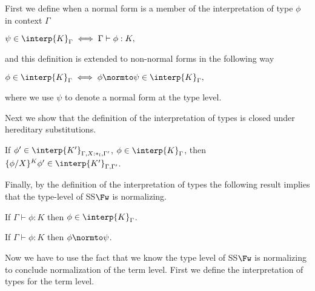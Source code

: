 \begin{definition}
  \label{def:interpretation_of_types_ssfw}
  First we define when a normal form is a member of the interpretation of type $\phi$ in context $\Gamma$
  \begin{center}
    \begin{math}
      \psi \in \interp{K}_\Gamma \iff \Gamma \vdash \phi:K,
  \end{math}
  \end{center}
  and this definition is extended to non-normal forms in the following way
  \begin{center}
    \begin{math}
      \phi \in \interp{K}_\Gamma \iff \phi \normto \psi \in \interp{K}_\Gamma,
  \end{math}
  \end{center}
 where we use $\psi$ to denote a normal form at the type level.
\end{definition}

\noindent 
Next we show that the definition of the interpretation of types is closed under
hereditary substitutions.  

\begin{lemma}
  If $\phi' \in \interp{K'}_{\Gamma,X:*_l,\Gamma'}$, $\phi \in \interp{K}_\Gamma$, then 
  $\{\phi/X\}^K \phi' \in \interp{K'}_{\Gamma,\Gamma'}$.
  
  \label{lemma:interpretation_of_types_closed_substitution_ssfw}
\end{lemma}

\noindent
Finally, by the definition of the interpretation of types the following result implies that the type-level
of SS$\Fw$ is normalizing.
\begin{thm}
  If $\Gamma \vdash \phi:K$ then $\phi \in \interp{K}_\Gamma$.
  \label{thm:soundness_ssfw}
\end{thm}

\begin{corollary}[Normalization]
  \label{coro:normalization_type_level_ssfw}
  If $\Gamma \vdash \phi:K$ then $\phi \normto \psi$.
\end{corollary}

Now we have to use the fact that we know the type level of SS$\Fw$ is
normalizing to conclude normalization of the term level.  First we
define the interpretation of types for the term level.

